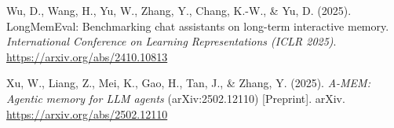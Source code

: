 \documentclass[12pt,a4paper]{article}
\begin{document}
\begin{singlespace}
\begin{list}{}{%
  \setlength{\leftmargin}{1.25cm}%
  \setlength{\itemindent}{-1.25cm}%
  \setlength{\itemsep}{0.8\baselineskip}%
  \setlength{\parsep}{0pt}%
}
\item Wu, D., Wang, H., Yu, W., Zhang, Y., Chang, K.-W., \& Yu, D. (2025). LongMemEval: Benchmarking chat assistants on long-term interactive memory. \textit{International Conference on Learning Representations (ICLR 2025)}. \url{https://arxiv.org/abs/2410.10813}

\item Xu, W., Liang, Z., Mei, K., Gao, H., Tan, J., \& Zhang, Y. (2025). \textit{A-MEM: Agentic memory for LLM agents} (arXiv:2502.12110) [Preprint]. arXiv. \url{https://arxiv.org/abs/2502.12110}
\end{list}
\end{singlespace}
\end{document}
